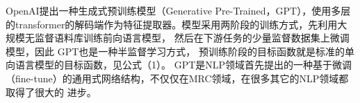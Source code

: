 OpenAI提出一种生成式预训练模型（Generative Pre-Trained，GPT），使用多层的transformer的解码端作为特征提取器。模型采用两阶段的训练方式，先利用大规模无监督语料库训练前向语言模型，
然后在下游任务的少量监督数据集上微调模型，因此
GPT也是一种半监督学习方式，
预训练阶段的目标函数就是标准的单向语言模型的目标函数，见公式（1）。
GPT是NLP领域首先提出的一种基于微调（fine-tune）的通用式网络结构，不仅仅在MRC领域，在很多其它的NLP领域都取得了很大的
进步。
                
        


